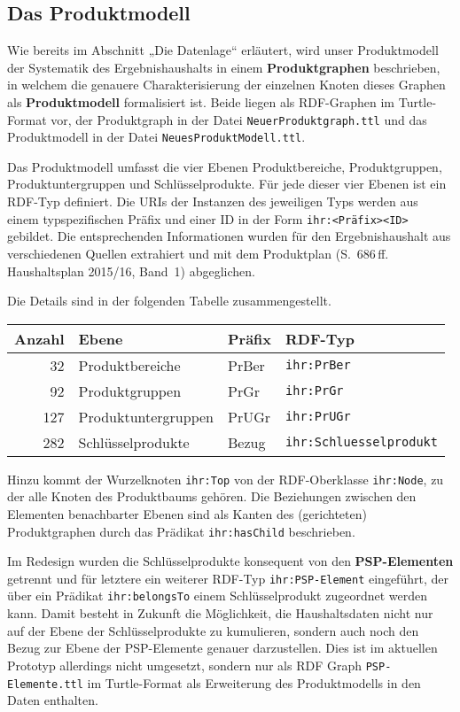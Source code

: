 \documentclass[a4paper,11pt,twoside]{article}
\begin{document}
\subsection{Das Produktmodell}

Wie bereits im Abschnitt „Die Datenlage“ erläutert, wird unser Produktmodell
der Systematik des Ergebnishaushalts in einem \textbf{Produktgraphen}
beschrieben, in welchem die genauere Charakterisierung der einzelnen Knoten
dieses Graphen als \textbf{Produktmodell} formalisiert ist.  Beide liegen als
RDF-Graphen im Turtle-Format vor, der Produktgraph in der Datei
\texttt{NeuerProduktgraph.ttl} und das Produktmodell in der Datei
\texttt{NeuesProduktModell.ttl}.

Das Produktmodell umfasst die vier Ebenen Produktbereiche, Produktgruppen,
Produktuntergruppen und Schlüsselprodukte.  Für jede dieser vier Ebenen ist ein
RDF-Typ definiert. Die URIs der Instanzen des jeweiligen Typs werden aus einem
typspezifischen Präfix und einer ID in der Form \texttt{ihr:<Präfix><ID>}
gebildet.  Die entsprechenden Informationen wurden für den Ergebnishaushalt aus
verschiedenen Quellen extrahiert und mit dem Produktplan
(S.~686\,ff. Haushaltsplan 2015/16, Band~1) abgeglichen.

Die Details sind in der folgenden Tabelle zusammengestellt.
\begin{center}
  \begin{tabular}{rlll}
    Anzahl & Ebene & Präfix & RDF-Typ \\\hline
    32 & Produktbereiche & PrBer & \texttt{ihr:PrBer}\\
    92 & Produktgruppen & PrGr & \texttt{ihr:PrGr} \\
    127 & Produktuntergruppen & PrUGr & \texttt{ihr:PrUGr} \\
    282 & Schlüsselprodukte & Bezug & \texttt{ihr:Schluesselprodukt}\\
  \end{tabular}
\end{center}
Hinzu kommt der Wurzelknoten \texttt{ihr:Top} von der RDF-Oberklasse
\texttt{ihr:Node}, zu der alle Knoten des Produktbaums gehören.  Die
Beziehungen zwischen den Elementen benachbarter Ebenen sind als Kanten des
(gerichteten) Produktgraphen durch das Prädikat \texttt{ihr:hasChild}
beschrieben.

Im Redesign wurden die Schlüsselprodukte konsequent von den
\textbf{PSP-Elementen} getrennt und für letztere ein weiterer RDF-Typ
\texttt{ihr:PSP-Element} eingeführt, der über ein Prädikat
\texttt{ihr:belongsTo} einem Schlüsselprodukt zugeordnet werden kann.  Damit
besteht in Zukunft die Möglichkeit, die Haushaltsdaten nicht nur auf der Ebene
der Schlüsselprodukte zu kumulieren, sondern auch noch den Bezug zur Ebene der
PSP-Elemente genauer darzustellen.  Dies ist im aktuellen Prototyp allerdings
nicht umgesetzt, sondern nur als RDF Graph \texttt{PSP-Elemente.ttl} im
Turtle-Format als Erweiterung des Produktmodells in den Daten enthalten.
\end{document}
